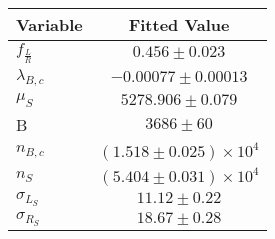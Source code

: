 \begin{tabular}[t]{lc}
\hline
Variable &Fitted Value\\
\hline\hline
$f_{\frac{L}{R}}$&$0.456\pm0.023$\\
\hline
$\lambda_{B,c}$&$-0.00077\pm0.00013$\\
\hline
$\mu_S$&$5278.906\pm0.079$\\
\hline
B&$3686\pm60$\\
\hline
$n_{B,c}$&$(1.518\pm0.025)\times 10^4$\\
\hline
$n_S$&$(5.404\pm0.031)\times 10^4$\\
\hline
$\sigma_{L_S}$&$11.12\pm0.22$\\
\hline
$\sigma_{R_S}$&$18.67\pm0.28$\\
\hline
\end{tabular}